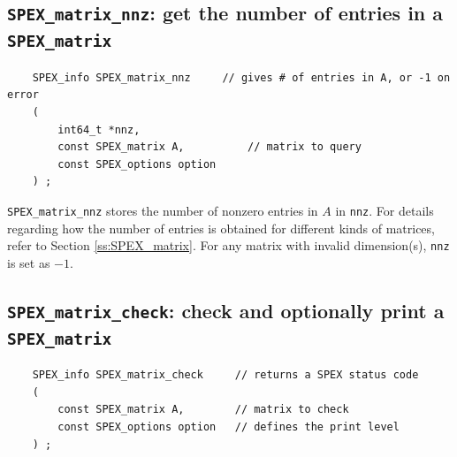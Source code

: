 \documentclass[12pt,oneside]{book}
\theoremstyle{definition}
\begin{document}
\subsection{\texttt{SPEX\_matrix\_nnz}: get the number of entries in a \texttt{SPEX\_matrix}}
\label{s:user:matrix_nnz}
\begin{mdframed}[userdefinedwidth=\textwidth]
{\footnotesize
\begin{verbatim}
    SPEX_info SPEX_matrix_nnz     // gives # of entries in A, or -1 on error
    (
        int64_t *nnz,
        const SPEX_matrix A,          // matrix to query
        const SPEX_options option
    ) ;
\end{verbatim}
} \end{mdframed}

\verb|SPEX_matrix_nnz| stores the number of nonzero entries in $A$ in \verb|nnz|.
For details regarding how the number of entries is obtained for different kinds
of matrices, refer to Section \ref{ss:SPEX_matrix}.
For any matrix with invalid dimension(s), \verb'nnz' is set as $-1$.


\subsection{\texttt{SPEX\_matrix\_check}: check and optionally print a \texttt{SPEX\_matrix}} \label{s:user:matrix_check}
\begin{mdframed}[userdefinedwidth=\textwidth]
{\footnotesize
\begin{verbatim}
    SPEX_info SPEX_matrix_check     // returns a SPEX status code
    (
        const SPEX_matrix A,        // matrix to check
        const SPEX_options option   // defines the print level
    ) ;
\end{verbatim}
} \end{mdframed}
\end{document}
